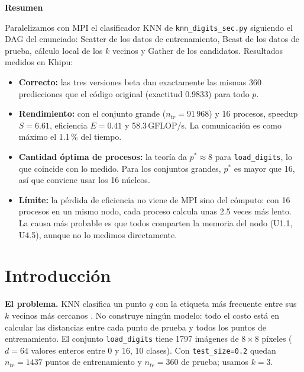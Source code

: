 \documentclass[11pt,a4paper]{article}
\newcommand{\ntr}{n_{tr}}
\newcommand{\nte}{n_{te}}
\begin{document}
\tableofcontents
\thispagestyle{fancy}
\clearpage
{}

\noindent\colorbox{cajafondo}{\begin{minipage}{\dimexpr\linewidth-2\fboxsep\relax}
\vspace{0.3em}
{\large\bfseries\color{utecazul} Resumen}\par\vspace{0.4em}
Paralelizamos con MPI el clasificador KNN de \texttt{knn\_digits\_sec.py} siguiendo el DAG del enunciado: Scatter de los datos de entrenamiento, Bcast de los datos de prueba, cálculo local de los $k$ vecinos y Gather de los candidatos. Resultados medidos en Khipu:
\begin{itemize}\setlength{\itemsep}{1pt}
\item \textbf{Correcto:} las tres versiones beta dan exactamente las mismas 360 predicciones que el código original (exactitud 0.9833) para todo $p$.
\item \textbf{Rendimiento:} con el conjunto grande ($\ntr=91\,968$) y 16 procesos, speedup $S=6.61$, eficiencia $E=0.41$ y 58.3\,GFLOP/s. La comunicación es como máximo el 1.1\,\% del tiempo.
\item \textbf{Cantidad óptima de procesos:} la teoría da $p^*\approx8$ para \texttt{load\_digits}, lo que coincide con lo medido. Para los conjuntos grandes, $p^*$ es mayor que 16, así que conviene usar los 16 núcleos.
\item \textbf{Límite:} la pérdida de eficiencia no viene de MPI sino del cómputo: con 16 procesos en un mismo nodo, cada proceso calcula unas 2.5 veces más lento. La causa más probable es que todos comparten la memoria del nodo (U1.1, U4.5), aunque no lo medimos directamente.
\end{itemize}
\vspace{0.1em}
\end{minipage}}
\vspace{0.6em}

\section{Introducción}
\textbf{El problema.} KNN clasifica un punto $q$ con la etiqueta más frecuente entre sus $k$ vecinos más cercanos \cite{fix1951,cover1967}. No construye ningún modelo: todo el costo está en calcular las distancias entre cada punto de prueba y todos los puntos de entrenamiento. El conjunto \texttt{load\_digits} \cite{sklearn} tiene 1797 imágenes de $8\times8$ píxeles ($d=64$ valores enteros entre 0 y 16, 10 clases). Con \texttt{test\_size=0.2} quedan $\ntr=1437$ puntos de entrenamiento y $\nte=360$ de prueba; usamos $k=3$.
\end{document}

